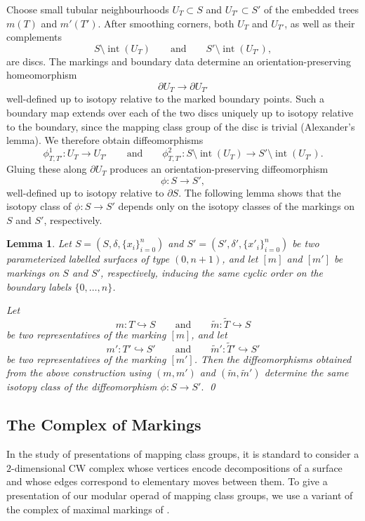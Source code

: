 \documentclass{amsart}
\newtheorem{lemma}[theorem]{Lemma}%
\theoremstyle{definition}
\numberwithin{equation}{section}
\begin{document}
Choose small tubular neighbourhoods $U_T\subset S$ and $U_{T'}\subset S'$ of the embedded trees $m(T)$ and $m'(T')$. After smoothing corners, both $U_T$ and $U_{T'}$, as well as their complements
\[
S\setminus \operatorname{int}(U_T)
\qquad\text{and}\qquad
S'\setminus \operatorname{int}(U_{T'}),
\]
are discs. The markings and boundary data determine an orientation-preserving homeomorphism
\[
\partial U_T \longrightarrow \partial U_{T'}
\]
well-defined up to isotopy relative to the marked boundary points. Such a boundary map extends over each of the two discs uniquely up to isotopy relative to the boundary, since the mapping class group of the disc is trivial (Alexander’s lemma). We therefore obtain diffeomorphisms 
\[
\phi_{T,T'}^1:U_T\to U_{T'}
\qquad\text{and}\qquad
\phi_{T,T'}^2:S\setminus \operatorname{int}(U_T)\to S'\setminus \operatorname{int}(U_{T'}).
\]
Gluing these along $\partial U_T$ produces an orientation-preserving diffeomorphism
\[
\phi:S\to S',
\]
well-defined up to isotopy relative to $\partial S$.  The following lemma shows that the isotopy class of $\phi:S\rightarrow S'$ depends only on the isotopy classes of the markings on $S$ and $S'$, respectively.


\begin{lemma}\label{lemma: marking-independence} 
Let $S=(S,\delta,\{x_{i}\}_{i=0}^{n})$ and $S'=(S',\delta',\{x'_{i}\}_{i=0}^{n})$ be two parameterized labelled surfaces of type $(0,n+1)$, and let $[m]$ and $[m']$
be markings on $S$ and $S'$, respectively, inducing the same cyclic order on the boundary labels $\{0,\ldots,n\}$.

Let
\[
m:T\hookrightarrow S\qquad \text{and}\qquad \tilde m:\widetilde T\hookrightarrow S
\]
be two representatives of the marking $[m]$, and let
\[
m':T'\hookrightarrow S'\qquad \text{and}\qquad  \tilde m':\widetilde T'\hookrightarrow S'
\]
be two representatives of the marking $[m']$.
Then the diffeomorphisms obtained from the above construction using $(m,m')$ and $(\tilde m,\tilde m')$ determine the same isotopy class of the diffeomorphism $\phi: S\to S'.$ \qed
\end{lemma}



\subsection{The Complex of Markings}\label{sec: complex of markings}
In the study of presentations of mapping class groups, it is standard to consider a $2$-dimensional CW complex whose vertices encode decompositions of a surface and whose edges correspond to elementary moves between them. To give a presentation of our modular operad of mapping class groups, we use a variant of the complex of maximal markings of \cite[Section~5]{bk_marked_surfaces}.
\end{document}
